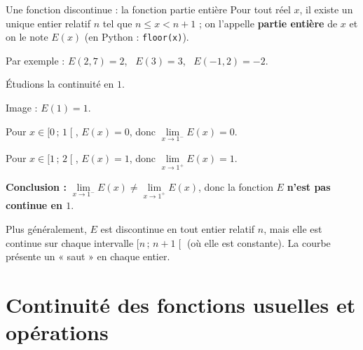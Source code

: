 \documentclass[11pt,a4paper]{article}
\newcommand{\intfo}[2]{\mathopen{[}#1\,;\,#2\mathclose{[}}
\newcommand{\limg}[2]{\lim\limits_{x\to #1^-}#2}
\newcommand{\limd}[2]{\lim\limits_{x\to #1^+}#2}
\begin{document}
\begin{exemple}{Une fonction discontinue : la fonction partie entière}{}
Pour tout réel $x$, il existe un unique entier relatif $n$ tel que
$n\leqslant x<n+1$ ; on l'appelle \textbf{partie entière} de $x$ et on le note
$E(x)$ (en Python : \texttt{floor(x)}).

Par exemple : $E(2{,}7)=2$, \ $E(3)=3$, \ $E(-1{,}2)=-2$.

\begin{minipage}[c]{0.55\linewidth}
Étudions la continuité en $1$.
\begin{etapes}
  \item Image : $E(1)=1$.
  \item Pour $x\in\intfo{0}{1}$, $E(x)=0$, donc $\limg{1}{E(x)}=0$.
  \item Pour $x\in\intfo{1}{2}$, $E(x)=1$, donc $\limd{1}{E(x)}=1$.
\end{etapes}

\textbf{Conclusion :} $\limg{1}{E(x)}\neq\limd{1}{E(x)}$, donc la fonction $E$
\textbf{n'est pas continue en $1$}.
\end{minipage}\hfill
\begin{minipage}[c]{0.41\linewidth}
\centering
{}
\end{minipage}

Plus généralement, $E$ est discontinue en tout entier relatif $n$, mais elle est
continue sur chaque intervalle $\intfo{n}{n+1}$ (où elle est constante).
La courbe présente un « saut » en chaque entier.
\end{exemple}

\section{Continuité des fonctions usuelles et opérations}\label{sec:usuelles}
\end{document}
